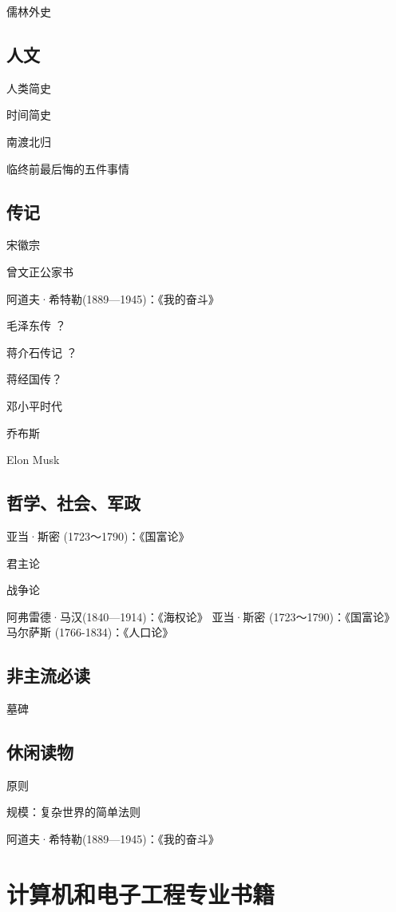 儒林外史

\subsection{人文}

人类简史

时间简史

南渡北归

临终前最后悔的五件事情


\subsection{传记}

宋徽宗


曾文正公家书

阿道夫·希特勒(1889—1945)：《我的奋斗》

毛泽东传 ？

蒋介石传记 ？

蒋经国传？

邓小平时代

乔布斯

Elon Musk


\subsection{哲学、社会、军政}

亚当·斯密 (1723～1790)：《国富论》

君主论

战争论

阿弗雷德·马汉(1840—1914)：《海权论》
亚当·斯密 (1723～1790)：《国富论》
马尔萨斯 (1766-1834)：《人口论》


\subsection{非主流必读 }

墓碑

\subsection{休闲读物}

原则

规模：复杂世界的简单法则

阿道夫·希特勒(1889—1945)：《我的奋斗》

\section{计算机和电子工程专业书籍}


